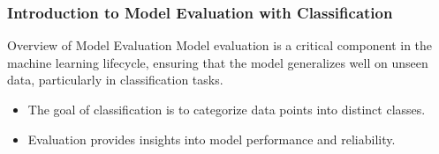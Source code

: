 \documentclass[aspectratio=169]{beamer}
\begin{document}
\frame{\titlepage}

\begin{frame}[fragile]
    \frametitle{Introduction to Model Evaluation with Classification}

    \begin{block}{Overview of Model Evaluation}
        Model evaluation is a critical component in the machine learning lifecycle, ensuring that the model generalizes well on unseen data, particularly in classification tasks.
    \end{block}

    \begin{itemize}
        \item The goal of classification is to categorize data points into distinct classes.
        \item Evaluation provides insights into model performance and reliability.
    \end{itemize}
\end{frame}
\end{document}
